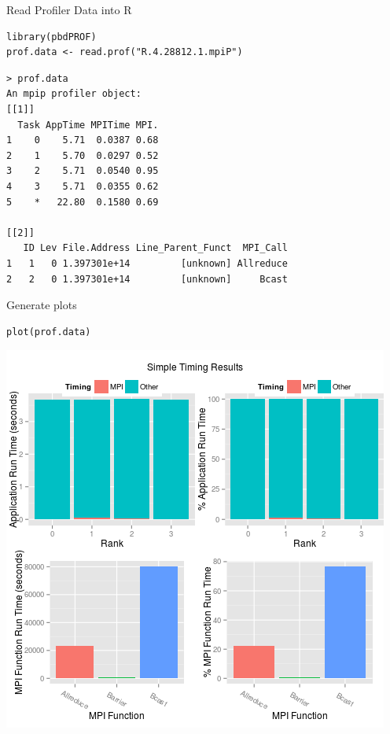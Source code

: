 \begin{frame}[fragile]
  \begin{block}{Read Profiler Data into R}
\vspace{-.2cm}
\begin{lstlisting}[title=Interactively (or in batch) Read in Profiler Data]
library(pbdPROF)
prof.data <- read.prof("R.4.28812.1.mpiP") 
\end{lstlisting}
\vspace{-.2cm}
\begin{lstlisting}[language=shl,title=Partial Output of Example Data]
> prof.data
An mpip profiler object:
[[1]]
  Task AppTime MPITime MPI.
1    0    5.71  0.0387 0.68
2    1    5.70  0.0297 0.52
3    2    5.71  0.0540 0.95
4    3    5.71  0.0355 0.62
5    *   22.80  0.1580 0.69

[[2]]
   ID Lev File.Address Line_Parent_Funct  MPI_Call
1   1   0 1.397301e+14         [unknown] Allreduce
2   2   0 1.397301e+14         [unknown]     Bcast
\end{lstlisting}
  \end{block}
\end{frame}



\begin{frame}[fragile]
  \begin{block}{Generate plots}
  \begin{center}\vspace{-.6cm}
\begin{lstlisting}
plot(prof.data)
\end{lstlisting}\vspace{-.2cm}
\includegraphics[scale=.39]{../common/pics/prof/timing.png}
\end{center}
  \end{block}
\end{frame}


